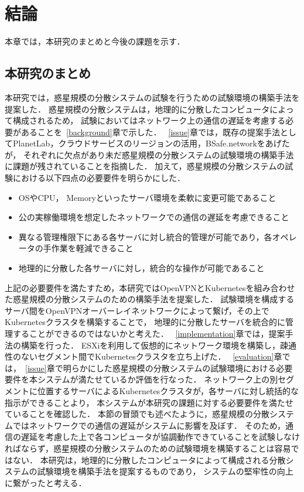 \chapter{結論}
\label{conclusion}

本章では，本研究のまとめと今後の課題を示す．

\section{本研究のまとめ}
\label{conclusion:conclusion}

本研究では，惑星規模の分散システムの試験を行うための試験環境の構築手法を提案した．
惑星規模の分散システムは，地理的に分散したコンピュータによって構成されるため，
試験においてはネットワーク上の通信の遅延を考慮する必要があることを~\ref{background}章で示した．
~\ref{issue}章では，既存の提案手法としてPlanetLab，クラウドサービスのリージョンの活用，BSafe.networkをあげたが，
それぞれに欠点があり未だ惑星規模の分散システムの試験環境の構築手法に課題が残されていることを指摘した．
加えて，惑星規模の分散システムの試験における以下四点の必要要件を明らかにした．
\begin{itemize}
  \item OSやCPU， Memoryといったサーバ環境を柔軟に変更可能であること
  \item 公の実稼働環境を想定したネットワークでの通信の遅延を考慮できること
  \item 異なる管理権限下にある各サーバに対し統合的管理が可能であり，各オペレータの手作業を軽減できること
  \item 地理的に分散した各サーバに対し，統合的な操作が可能であること
\end{itemize}
上記の必要要件を満たすため，本研究ではOpenVPNとKubernetesを組み合わせた惑星規模の分散システムのための構築手法を提案した．
試験環境を構成するサーバ間をOpenVPNオーバーレイネットワークによって繋げ，その上でKubernetesクラスタを構築することで，
地理的に分散したサーバを統合的に管理することができるのではないかと考えた．
~\ref{implementation}章では，提案手法の構築を行った．
ESXiを利用して仮想的にネットワーク環境を構築し，疎通性のないセグメント間でKubernetesクラスタを立ち上げた．
~\ref{evaluation}章では，~\ref{issue}章で明らかにした惑星規模の分散システムの試験環境における必要要件を本システムが満たせているか評価を行なった．
ネットワーク上の別セグメントに位置するサーバによるKubernetesクラスタが，各サーバに対し統括的な指示ができることより，
本システムが本研究の課題に対する必要要件を満たせていることを確認した．
本節の冒頭でも述べたように，惑星規模の分散システムではネットワークでの通信の遅延がシステムに影響を及ぼす．
そのため，通信の遅延を考慮した上で各コンピュータが協調動作できていることを試験しなければならず，惑星規模の分散システムのための試験環境を構築することは容易ではない．
本研究は，地理的に分散したコンピュータによって構成される分散システムの試験環境を構築手法を提案するものであり，
システムの堅牢性の向上に繋がったと考える．

